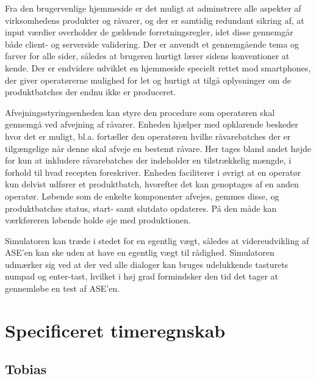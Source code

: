 \documentclass[a4paper]{article}
\begin{document}
Fra den brugervenlige hjemmeside er det muligt at adminstrere alle aspekter af virksomhedens produkter og råvarer, og der er samtidig redundant sikring af, at input værdier overholder de gældende forretningsregler, idet disse gennemgår både client- og serverside validering. Der er anvendt et gennemgående tema og farver for alle sider, således at brugeren hurtigt lærer sidens konventioner at kende. Der er endvidere udviklet en hjemmeside specielt rettet mod smartphones, der giver operatørerne mulighed for let og hurtigt at tilgå oplysninger om de produktbatches der endnu ikke er produceret.

Afvejningsstyringsenheden kan styre den procedure som operatøren skal gennemgå ved afvejning af råvarer. Enheden hjælper med opklarende beskeder hvor det er muligt, bl.a. fortæller den operatøren hvilke råvarebatches der er tilgængelige når denne skal afveje en bestemt råvare. Her tages bland andet højde for kun at inkludere råvarebatches der indeholder en tilstrækkelig mængde, i forhold til hvad recepten foreskriver. Enheden faciliterer i øvrigt at en operatør kun delvist udfører et produktbatch, hvorefter det kan genoptages af en anden operatør. Løbende som de enkelte komponenter afvejes, gemmes disse, og produktbatches status, start- samt slutdato opdateres. På den måde kan værkføreren løbende holde øje med produktionen.

Simulatoren kan træde i stedet for en egentlig vægt, således at videreudvikling af ASE'en kan ske uden at have en egentlig vægt til rådighed. Simulatoren udmærker sig ved at der ved alle dialoger kan bruges udelukkende tasturets numpad og enter-tast, hvilket i høj grad formindsker den tid det tager at gennemløbe en test af ASE'en.
\clearpage

\appendix

\section{Specificeret timeregnskab} %
\label{sec:Specificeret timeregnskab}

\subsection{Tobias} %
\end{document}
